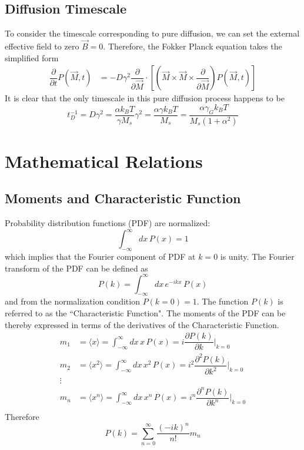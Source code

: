 \documentclass[aps,prb,onecolumn,notitlepage,showpacs,floatfix,superscriptaddress]{revtex4-1}
\begin{document}
\subsection*{Diffusion Timescale}
To consider the timescale corresponding to pure diffusion, we can set the external effective field to zero $\vec{B}=0$. Therefore, the Fokker Planck equation takes the simplified form
\begin{equation}
\begin{split}
\dfrac{\partial}{\partial t} P(\vec{M},t) &= - D \gamma^2 \dfrac{\partial}{\partial \vec{M}} \cdot \left[\left(\vec{M} \times \vec{M} \times \dfrac{\partial}{\partial \vec{M}} \right) P(\vec{M},t) \right]  
 \end{split}
\end{equation}
It is clear that the only timescale in this pure diffusion process happens to be
\begin{equation}
t_D^{-1} = D \gamma^2 = \dfrac{\alpha k_B T }{\gamma M_s} \gamma^2 = \dfrac{\alpha \gamma k_B T }{ M_s}  = \dfrac{\alpha \gamma_G k_B T }{ M_s (1+\alpha^2)} 
\end{equation}
\section*{Mathematical Relations}
\subsection*{Moments and Characteristic Function}
Probability distribution functions (PDF) are normalized:
\begin{equation}
\int_{-\infty}^{\infty} dx \, P(x) = 1
\end{equation}
which implies that the Fourier component of PDF at $k=0$ is unity. The Fourier transform of the PDF can be defined as
\begin{equation}
P(k) = \int_{-\infty}^{\infty} dx \, e^{-ikx} \, P(x) 
\end{equation} 
and from the normalization condition $P(k=0)=1$. The function $P(k)$ is referred to as the ``Characteristic Function". The moments of the PDF can be thereby expressed in terms of the derivatives of the Characteristic Function.
\begin{equation}
\begin{split}
m_1 &= \langle x \rangle = \int_{-\infty}^{\infty} dx \, x \, P(x) = i \dfrac{\partial P(k)}{\partial k} \bigg\vert_{k=0} \\
m_2 &= \langle x^2 \rangle = \int_{-\infty}^{\infty} dx \, x^2 \, P(x) = i^2 \dfrac{\partial^2 P(k)}{\partial k^2} \bigg\vert_{k=0} \\
\vdots \\
m_n &= \langle x^n \rangle = \int_{-\infty}^{\infty} dx \, x^n \, P(x) = i^n \dfrac{\partial^n P(k)}{\partial k^n} \bigg\vert_{k=0} \\
\end{split}
\end{equation}
Therefore
\begin{equation}
P(k) = \sum_{n=0}^{\infty} \dfrac{(-i k)^n}{n!} m_n
\end{equation}
\end{document}
